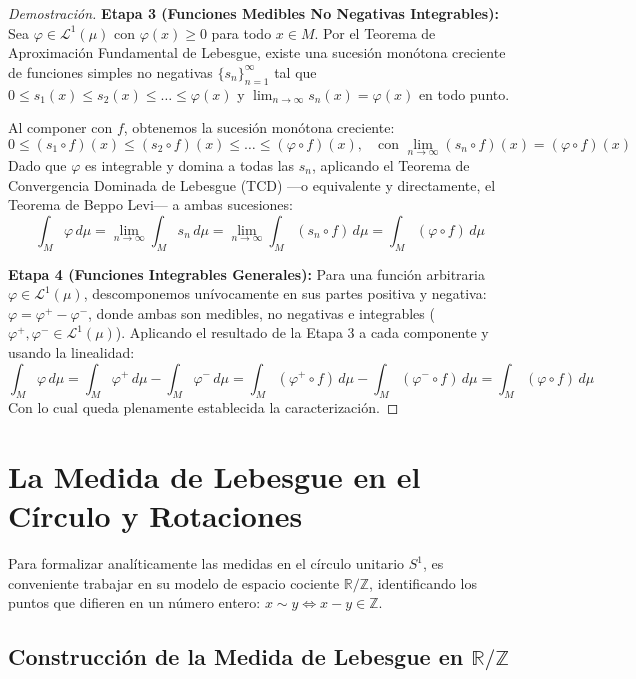 \begin{proof}[Demostración]
	\textbf{Etapa 3 (Funciones Medibles No Negativas Integrables):} Sea $\varphi \in \mathcal{L}^1(\mu)$ con $\varphi(x) \ge 0$ para todo $x \in M$. Por el Teorema de Aproximación Fundamental de Lebesgue, existe una sucesión monótona creciente de funciones simples no negativas $\{s_n\}_{n=1}^\infty$ tal que $0 \le s_1(x) \le s_2(x) \le \dots \le \varphi(x)$ y $\lim_{n \to \infty} s_n(x) = \varphi(x)$ en todo punto.
	
	Al componer con $f$, obtenemos la sucesión monótona creciente:
	$$ 0 \le (s_1 \circ f)(x) \le (s_2 \circ f)(x) \le \dots \le (\varphi \circ f)(x), \quad \text{con } \lim_{n \to \infty} (s_n \circ f)(x) = (\varphi \circ f)(x) $$
	Dado que $\varphi$ es integrable y domina a todas las $s_n$, aplicando el Teorema de Convergencia Dominada de Lebesgue (TCD) —o equivalente y directamente, el Teorema de Beppo Levi— a ambas sucesiones:
	$$ \int_M \varphi \, d\mu = \lim_{n \to \infty} \int_M s_n \, d\mu = \lim_{n \to \infty} \int_M (s_n \circ f) \, d\mu = \int_M (\varphi \circ f) \, d\mu $$
	
	\textbf{Etapa 4 (Funciones Integrables Generales):} Para una función arbitraria $\varphi \in \mathcal{L}^1(\mu)$, descomponemos unívocamente en sus partes positiva y negativa: $\varphi = \varphi^+ - \varphi^-$, donde ambas son medibles, no negativas e integrables ($\varphi^+, \varphi^- \in \mathcal{L}^1(\mu)$). Aplicando el resultado de la Etapa 3 a cada componente y usando la linealidad:
	$$ \int_M \varphi \, d\mu = \int_M \varphi^+ \, d\mu - \int_M \varphi^- \, d\mu = \int_M (\varphi^+ \circ f) \, d\mu - \int_M (\varphi^- \circ f) \, d\mu = \int_M (\varphi \circ f) \, d\mu $$
	Con lo cual queda plenamente establecida la caracterización.
\end{proof}

\section{La Medida de Lebesgue en el Círculo y Rotaciones}

Para formalizar analíticamente las medidas en el círculo unitario $S^1$, es conveniente trabajar en su modelo de espacio cociente $\mathbb{R}/\mathbb{Z}$, identificando los puntos que difieren en un número entero: $x \sim y \iff x - y \in \mathbb{Z}$.

\subsection{Construcción de la Medida de Lebesgue en \texorpdfstring{$\mathbb{R}/\mathbb{Z}$}{R/Z}}

